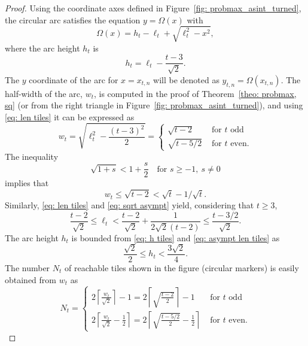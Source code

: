 \documentclass[12pt, a4paper]{article}
\newcommand{\len}{\ell} %
\newcommand{\tiles}{t} %
\newcommand{\genvar}{s}
\newcommand{\funcirc}{\Omega}
\begin{document}
\begin{proof}
Using the coordinate axes defined in Figure~\ref{fig: probmax_asint_turned}, the circular arc satisfies the equation $y = \funcirc(x)$ with
\begin{equation}
\label{eq: funcirc}
\funcirc(x) = h_\tiles - \len_\tiles + \sqrt{\len_\tiles^2-x^2},
\end{equation}
where the arc height $h_\tiles$ is 
\begin{equation}
\label{eq: h tiles}
h_\tiles = \len_\tiles - \frac{\tiles-3}{\sqrt{2}}.
\end{equation}
The $y$ coordinate of the arc for $x=x_{\tiles,n}$ will be denoted as $y_{\tiles,n} = \funcirc(x_{\tiles,n})$. The half-width of the arc, $w_\tiles$, is computed in the proof of Theorem~\ref{theo: probmax, sq} (or from the right triangle in Figure~\ref{fig: probmax_asint_turned}), and using \eqref{eq: len tiles} it can be expressed as
\begin{equation}
\label{eq: w}
w_\tiles = \sqrt{\len_\tiles^2-\frac{(\tiles-3)^2}{2}} =
\begin{cases}
\displaystyle
\sqrt{\tiles-2} & \text{ for $\tiles$ odd} \\
\displaystyle
\sqrt{\tiles-5/2} & \text{ for $\tiles$ even}.
\end{cases}
\end{equation}
The inequality
\begin{equation}
\label{eq: sqrt asympt}
\sqrt{1+\genvar} < 1 + \frac \genvar 2 \quad\text{for } s \geq -1, \ s \neq 0
\end{equation}
implies that
\begin{equation}
\label{eq: asympt w}
w_\tiles \leq \sqrt{\tiles-2} < \sqrt{\tiles} - 1/\sqrt\tiles.
\end{equation}
Similarly, \eqref{eq: len tiles} and \eqref{eq: sqrt asympt} yield, considering that $\tiles \geq 3$,
\begin{equation}
\label{eq: asympt len tiles}
\frac{\tiles-2}{\sqrt{2}} \leq \len_\tiles < \frac{\tiles-2}{\sqrt{2}} + \frac{1}{2\sqrt{2}(\tiles-2)}
\leq \frac{\tiles-3/2}{\sqrt{2}}.
\end{equation}
The arc height $h_\tiles$ is bounded from \eqref{eq: h tiles} and \eqref{eq: asympt len tiles} as
\begin{equation}
\label{eq: h bound}
\frac {\sqrt{2}} 2 \leq h_\tiles <
\frac{3\sqrt{2}}{4}.
\end{equation}
The number $N_\tiles$ of reachable tiles shown in the figure (circular markers) is easily obtained from $w_\tiles$ as
\begin{equation}
\label{eq: N tiles}
N_\tiles = 
\begin{cases}
\displaystyle
2\left\lceil \frac{w_\tiles}{\sqrt{2}} \right\rceil - 1 = 2\left\lceil \sqrt{\frac{\tiles-2}{2}} \right\rceil - 1 & \text{ for $\tiles$ odd} \\[5mm] %
\displaystyle
2\left\lceil \frac{w_\tiles}{\sqrt{2}} - \frac 1 2 \right\rceil = 2\left\lceil \sqrt{\frac{\tiles-5/2}{2}} - \frac 1 2 \right\rceil & \text{ for $\tiles$ even}.
\end{cases}
\end{equation}


\end{proof}
\end{document}
